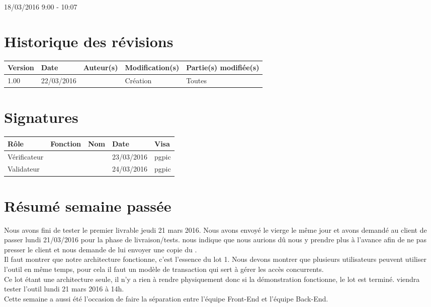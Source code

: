 \documentclass [a4paper] {article}
\begin{document}
18/03/2016			 				%
\hfill   
\hfill 	 9:00 - 10:07 				%


\section*{Historique des révisions}
\begin{center}
			\begin{tabular}{| p{2.5cm} | p{3cm} | p{3cm} | p{3cm} | p{3.5cm} |}
				\hline
				\rowcolor{Gray}
				Version & Date & Auteur(s) & Modification(s) & Partie(s) modifiée(s)		 \\
				\hline
				1.00 & 22/03/2016 & \Pierre & Création & Toutes \\
		\hline		
			\end{tabular}
		\end{center}

\section*{Signatures}

		\begin{center}
			\begin{tabular}{| p{2.5cm} | p{4cm} | p{3cm} | p{3cm} | p{2.5cm} |}
				\hline
				\rowcolor{Gray}
				Rôle & Fonction & Nom & Date & Visa		 \\
				\hline
				Vérificateur & \RQA & \Kafui & 23/03/2016 & pgpic \\[30pt]
				\hline
				Validateur & \CP & \Sergi & 24/03/2016 & pgpic \\[30pt]	
				\hline
			\end{tabular}
		\end{center}


\section{Résumé semaine passée}
Nous avons fini de tester le premier livrable jeudi 21 mars 2016. Nous avons envoyé le \CDR{} vierge le même jour et avons demandé au client de passer lundi 21/03/2016 pour la phase de livraison/tests. \nomTuteurPedago{} nous indique que nous aurions dû nous y prendre plus à l'avance afin de ne pas presser le client et nous demande de lui envoyer une copie du \CDR{}. \\
Il faut montrer que notre architecture fonctionne, c'est l'essence du lot 1. Nous devons montrer que plusieurs utilisateurs peuvent utiliser l'outil en même temps, pour cela il faut un modèle de transaction qui sert à gérer les accès concurrents. \\
Ce lot étant une architecture seule, il n'y a rien à rendre physiquement donc si la démonstration fonctionne, le lot est terminé. \nomTuteurPedago{} viendra tester l'outil lundi 21 mars 2016 à 14h. \\
Cette semaine a aussi été l'occasion de faire la séparation entre l'équipe Front-End et l'équipe Back-End.
\end{document}
